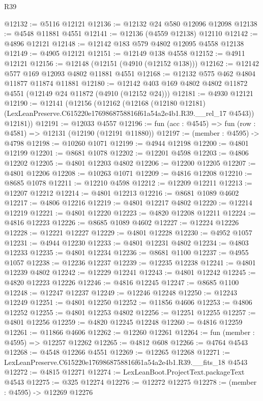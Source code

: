 \begin{lexlean}{R39}
\begin{coremodule}
@12132 := @5116 @12121
@12136 := @12132 @24 @580 @12096 @12098
@12138 := @4548 @11881 @4551
@12141 := @12136 (@4559 @12138) @12110
@12142 := @4896 @12121
@12148 := @12142 @183 @579 @4802 @12095 @4558 @12138
@12149 := @4905 @12121
@12151 := @12149 @138 @4558
@12152 := @4911 @12121
@12156 := @12148 (@12151 (@4910 (@12152 @138)))
@12162 := @12142 @577 @169 @12093 @4802 @11881 @4551
@12168 := @12132 @575 @462 @4804 @11877 @11874 @11881
@12180 := @12142 @403 @169 @4802 @4802 @11872 @4551 (@12149 @24 @11872 (@4910 (@12152 @24)))
@12181 := @4930 @12121
@12190 := @12141
    (@12156
      (@12162
        (@12168
          (@12180 @12181)
          (LexLeanPreserve.C615220e1769868758816f61a54a2e4b1.R39.__rel_17 @4543))
        @12181))
@12191 := @12033 @4557
@12196 := fun (acc : @4545) => fun (row : @4581) => @12131 (@12190 (@12191 @11880))
@12197 := (member : @4595) -> @4798
@12198 := @10260 @1071
@12199 := @4944 @12198
@12200 := @4801 @12199
@12201 := @8681 @1078
@12202 := @12201 @4598
@12203 := @4806 @12202
@12205 := @4801 @12203 @4802
@12206 := @12200 @12205
@12207 := @4801 @12206
@12208 := @10263 @1071
@12209 := @4816 @12208
@12210 := @8685 @1078
@12211 := @12210 @4598
@12212 := @12209 @12211
@12213 := @12207 @12212
@12214 := @4801 @12213
@12216 := @8681 @1089 @4602
@12217 := @4806 @12216
@12219 := @4801 @12217 @4802
@12220 := @12214 @12219
@12221 := @4801 @12220
@12223 := @4820 @12208 @12211
@12224 := @4816 @12223
@12226 := @8685 @1089 @4602
@12227 := @12224 @12226
@12228 := @12221 @12227
@12229 := @4801 @12228
@12230 := @4952 @1057
@12231 := @4944 @12230
@12233 := @4801 @12231 @4802
@12234 := @4803 @12233
@12235 := @4801 @12234
@12236 := @8681 @1100
@12237 := @4955 @1057
@12238 := @12236 @12237
@12239 := @12235 @12238
@12241 := @4801 @12239 @4802
@12242 := @12229 @12241
@12243 := @4801 @12242
@12245 := @4820 @12223 @12226
@12246 := @4816 @12245
@12247 := @8685 @1100
@12248 := @12247 @12237
@12249 := @12246 @12248
@12250 := @12243 @12249
@12251 := @4801 @12250
@12252 := @11856 @4606
@12253 := @4806 @12252
@12255 := @4801 @12253 @4802
@12256 := @12251 @12255
@12257 := @4801 @12256
@12259 := @4820 @12245 @12248
@12260 := @4816 @12259
@12261 := @11866 @4606
@12262 := @12260 @12261
@12264 := fun (member : @4595) => @12257 @12262
@12265 := @4812 @608
@12266 := @4764 @4543
@12268 := @4548 @12266 @4551
@12269 := @12265 @12268
@12271 := LexLeanPreserve.C615220e1769868758816f61a54a2e4b1.R39.__fits_18 @4543
@12272 := @4815 @12271
@12274 := LexLeanBoot.ProjectText.packageText @4543
@12275 := @325 @12274
@12276 := @12272 @12275
@12278 := (member : @4595) -> @12269 @12276

\end{coremodule}
\end{lexlean}
